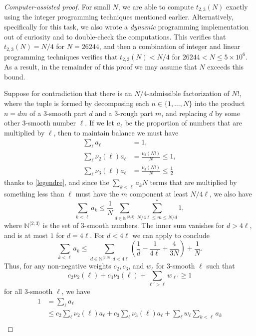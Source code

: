 \documentclass[10pt,a4paper,reqno]{amsart}
\numberwithin{equation}{section}
\theoremstyle{plain}
\theoremstyle{definition}
\newcommand\N{\mathbb{N}}
\begin{document}
\begin{proof}[Computer-assisted proof]
For small $N$, we are able to compute $t_{2,3}(N)$ exactly using the integer programming techniques mentioned earlier.
Alternatively, specifically for this task, we also wrote a \emph{dynamic} programming implementation out of curiosity and to double-check the computations.
This verifies that $t_{2,3}(N)=N/4$ for $N=26244$, and then a combination of integer and linear programming techniques verifies that $t_{2,3}(N) < N/4$ for $26244 < N \le 5\times 10^6$.
As a result, in the remainder of this proof we may assume that $N$ exceeds this bound.

Suppose for contradiction that there is an $N/4$-admissible factorization of $N!$, where the tuple is formed by decomposing each $n \in \{1,\dots,N\}$ into the product $n=dm$ of a $3$-smooth part $d$ and a $3$-rough part $m$, and replacing $d$ by some other $3$-smooth number $\ell$.  If we let $a_\ell$ be the proportion of numbers that are multiplied by $\ell$, then to maintain balance we must have
  \begin{align*}
    \sum_\ell a_\ell &= 1, \\
    \sum_\ell \nu_2(\ell) a_\ell &= \frac{\nu_2(N!)}{N} \leq 1, \\
    \sum_\ell \nu_3(\ell) a_\ell &= \frac{\nu_3(N!)}{N} \leq \frac{1}{2}
  \end{align*}
  thanks to \eqref{legendre}, and since the $\sum_{k < \ell} a_k N$ terms that are multiplied by something less than $\ell$ must have the $m$ component at least $N/4\ell$, we also have
  $$ \sum_{k < \ell} a_k \leq \frac{1}{N} \sum_{d \in \N^{\langle 2,3 \rangle}} \sum^*_{N/4\ell \leq m \leq N/d} 1,$$
  where $\N^{\langle 2,3 \rangle}$ is the set of $3$-smooth numbers.
  The inner sum vanishes for $d > 4\ell$, and is at most $1$ for $d = 4\ell$.  For $d < 4\ell$ we can apply  to conclude
  $$ \sum_{k < \ell} a_k \leq \sum_{d \in \N^{\langle 2,3 \rangle}: d < 4\ell} \left(\frac{1}{d}-\frac{1}{4\ell} + \frac{4}{3N}\right) + \frac{1}{N}.$$ 
  Thus, for any non-negative weights $c_2, c_3$, and $w_\ell$ for $3$-smooth $\ell$ such that
  \begin{equation}\label{ell-cond}
     c_2 \nu_2(\ell) + c_3 \nu_3(\ell) + \sum_{\ell' > \ell} w_{\ell'} \geq 1
  \end{equation}
  for all $3$-smooth $\ell$, we have
  \begin{align*}
    1 &= \sum_\ell a_\ell \\
    &\leq c_2 \sum_\ell \nu_2(\ell) a_\ell + c_3 \sum_\ell \nu_3(\ell) a_\ell + \sum_{\ell} w_\ell \sum_{k < \ell} a_k\\

\end{align*}
\end{proof}
\end{document}
